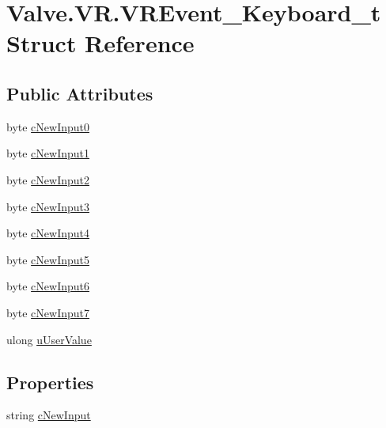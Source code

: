 \hypertarget{struct_valve_1_1_v_r_1_1_v_r_event___keyboard__t}{}\section{Valve.\+V\+R.\+V\+R\+Event\+\_\+\+Keyboard\+\_\+t Struct Reference}
\label{struct_valve_1_1_v_r_1_1_v_r_event___keyboard__t}
\subsection*{Public Attributes}
\begin{DoxyCompactItemize}
\item 
byte \mbox{\hyperlink{struct_valve_1_1_v_r_1_1_v_r_event___keyboard__t_a9c9027100a8a2bb3a895d61480f56580}{c\+New\+Input0}}
\item 
byte \mbox{\hyperlink{struct_valve_1_1_v_r_1_1_v_r_event___keyboard__t_a9119c6b148d8ea878d0cbcfd9b376d87}{c\+New\+Input1}}
\item 
byte \mbox{\hyperlink{struct_valve_1_1_v_r_1_1_v_r_event___keyboard__t_aa90338f8b30143f15ea52fc81e5daa46}{c\+New\+Input2}}
\item 
byte \mbox{\hyperlink{struct_valve_1_1_v_r_1_1_v_r_event___keyboard__t_a497b31d5a72fba9d076bf9111972541b}{c\+New\+Input3}}
\item 
byte \mbox{\hyperlink{struct_valve_1_1_v_r_1_1_v_r_event___keyboard__t_ab7abedb4274a20973ca4d41736cce04b}{c\+New\+Input4}}
\item 
byte \mbox{\hyperlink{struct_valve_1_1_v_r_1_1_v_r_event___keyboard__t_a856cceb66888353864539e801a15e5f0}{c\+New\+Input5}}
\item 
byte \mbox{\hyperlink{struct_valve_1_1_v_r_1_1_v_r_event___keyboard__t_add9e89d9e2b2b18d86f85dde96710fff}{c\+New\+Input6}}
\item 
byte \mbox{\hyperlink{struct_valve_1_1_v_r_1_1_v_r_event___keyboard__t_aa85aa7f3d73f17704d74b04fb6a351cf}{c\+New\+Input7}}
\item 
ulong \mbox{\hyperlink{struct_valve_1_1_v_r_1_1_v_r_event___keyboard__t_a0cdb5523f483ff565ad39bec9bf562e4}{u\+User\+Value}}
\end{DoxyCompactItemize}
\subsection*{Properties}
\begin{DoxyCompactItemize}
\item 
string \mbox{\hyperlink{struct_valve_1_1_v_r_1_1_v_r_event___keyboard__t_a21d76375c23f4d0648ae44690524d208}{c\+New\+Input}}
\end{DoxyCompactItemize}


